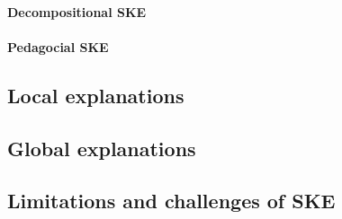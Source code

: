 \paragraph[Decompositional SKE]{Decompositional \Gls{SKE}}\label{par:decompositional-ske}

\paragraph[Pedagocial SKE]{Pedagocial \Gls{SKE}}\label{par:pedagogical-ske}

\subsection{Local explanations}\label{subsec:local-explanations}

\subsection{Global explanations}\label{subsec:global-explanations}

\subsection[Limitations and challenges of SKE]{Limitations and challenges of \Gls{SKE}}\label{subsec:limitations-and-challenges-of-ske}